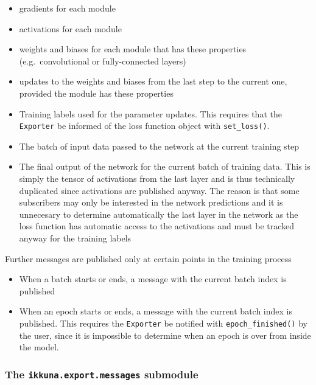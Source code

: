\begin{itemize}
    \item
        gradients for each module
    \item
        activations for each module
    \item
        weights and biases for each module that has these properties
        (e.g.~convolutional or fully-connected layers)
    \item
        updates to the weights and biases from the last step to the current
        one, provided the module has these properties
    \item
        Training labels used for the parameter updates. This requires that the
        \texttt{Exporter} be informed of the loss function object with
        \lstinline{set_loss()}.
    \item
        The batch of input data passed to the network at the current training step
    \item
        The final output of the network for the current batch of training data.
        This is simply the tensor of activations from the last layer and is thus
        technically duplicated since activations are published anyway. The
        reason is that some subscribers may only be interested in the network
        predictions and it is unnecesary to determine automatically the last
        layer in the network as the loss function has automatic access to
        the activations and must be tracked anyway for the training labels
\end{itemize}

Further messages are published only at certain points in the training process

\begin{itemize}
    \item
        When a batch starts or ends, a message with the current batch index is published
    \item
        When an epoch starts or ends, a message with the current batch index is
        published. This requires the \texttt{Exporter} be notified with
        \lstinline{epoch_finished()} by the user, since it is impossible to
        determine when an epoch is over from inside the model.
\end{itemize}

\subsubsection*{The \texttt{ikkuna.export.messages} submodule}

